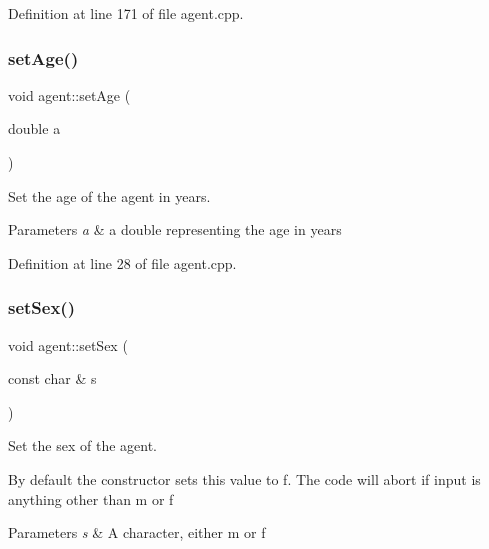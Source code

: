 Definition at line 171 of file agent.\+cpp.

\mbox{\label{classagent_ad5a0596438a813a44840ad542416dc50}} 
\subsubsection{\texorpdfstring{set\+Age()}{setAge()}}
{\footnotesize\ttfamily void agent\+::set\+Age (\begin{DoxyParamCaption}\item[{double}]{a }\end{DoxyParamCaption})}



Set the age of the agent in years. 


\begin{DoxyParams}{Parameters}
{\em a} & a double representing the age in years \\
\hline
\end{DoxyParams}


Definition at line 28 of file agent.\+cpp.

\mbox{\label{classagent_aaeb64899916c47b42bfdfbc43427d9a8}} 
\subsubsection{\texorpdfstring{set\+Sex()}{setSex()}}
{\footnotesize\ttfamily void agent\+::set\+Sex (\begin{DoxyParamCaption}\item[{const char \&}]{s }\end{DoxyParamCaption})}



Set the sex of the agent. 

By default the constructor sets this value to \textquotesingle{}f\textquotesingle{}. The code will abort if input is anything other than \textquotesingle{}m\textquotesingle{} or \textquotesingle{}f\textquotesingle{}


\begin{DoxyParams}{Parameters}
{\em s} & A character, either \textquotesingle{}m\textquotesingle{} or \textquotesingle{}f\textquotesingle{} \\
\hline
\end{DoxyParams}


